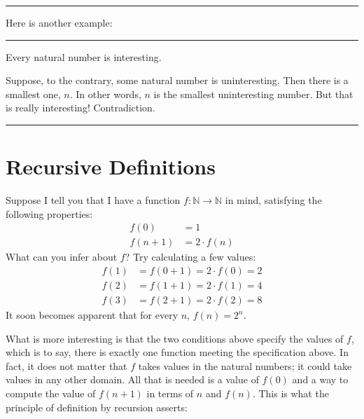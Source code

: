 \documentclass[letterpaper,10pt,english]{sphinxmanual}
\begin{document}
\bigskip\hrule\bigskip


\sphinxAtStartPar
Here is another example:


\bigskip\hrule\bigskip


\sphinxAtStartPar
{} Every natural number is interesting.

\sphinxAtStartPar
{} Suppose, to the contrary, some natural number is uninteresting. Then there is a smallest one, \(n\). In other words, \(n\) is the smallest uninteresting number. But that is really interesting! Contradiction.


\bigskip\hrule\bigskip



\section{Recursive Definitions}
\label{\detokenize{the_natural_numbers_and_induction:recursive-definitions}}\label{\detokenize{the_natural_numbers_and_induction:id2}}
\sphinxAtStartPar
Suppose I tell you that I have a function \(f : \mathbb{N} \to \mathbb{N}\) in
mind, satisfying the following properties:
\begin{equation*}
\begin{split}f(0) & = 1 \\
f(n + 1) & = 2 \cdot f(n)\end{split}
\end{equation*}
\sphinxAtStartPar
What can you infer about \(f\)? Try calculating a few values:
\begin{equation*}
\begin{split}f(1) & = f(0 + 1) = 2 \cdot f(0) = 2 \\
f(2) & = f(1 + 1) = 2 \cdot f(1) = 4 \\
f(3) & = f(2 + 1) = 2 \cdot f(2) = 8\end{split}
\end{equation*}
\sphinxAtStartPar
It soon becomes apparent that for every \(n\), \(f(n) = 2^n\).

\sphinxAtStartPar
What is more interesting is that the two conditions above specify  the values of \(f\), which is to say, there is exactly one function meeting the specification above. In fact, it does not matter that \(f\) takes values in the natural numbers; it could take values in any other domain. All that is needed is a value of \(f(0)\) and a way to compute the value of \(f(n+1)\) in terms of \(n\) and \(f(n)\). This is what the principle of definition by recursion asserts:
\end{document}
